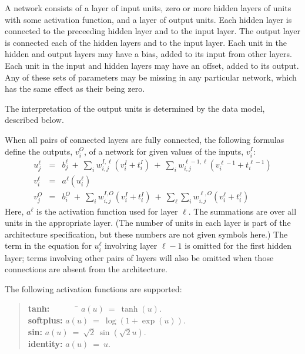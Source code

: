 \documentclass{report}[11pt]
\def\beq{\begin{eqnarray}}
\def\eeq{\end{eqnarray}}
\begin{document}
A network consists of a layer of input units, zero or more hidden
layers of units with some activation function, and a layer of output
units.  Each hidden layer is connected to the preceeding hidden layer
and to the input layer.  The output layer is connected each of the
hidden layers and to the input layer.  Each unit in the hidden and
output layers may have a bias, added to its input from other layers.
Each unit in the input and hidden layers may have an offset, added to
its output.  Any of these sets of parameters may be missing in any
particular network, which has the same effect as their being zero.

The interpretation of the output units is determined by the data
model, described below.

When all pairs of connected layers are fully connected, the following 
formulas define the outputs, $v^O_i$, of a network for given values 
of the inputs, $v^I_i$:\beq
  u^{\ell}_j & = & b^{\ell}_j \ +\ \sum_i w^{I,\ell}_{i,j} (v^I_i+t^I_i) 
                   \ +\ \sum_i w^{\ell-1,\ell}_{i,j} (v^{\ell-1}_i+t^{\ell-1}_i)
     \label{func1} \\[3pt]
  v^{\ell}_i & = & a^{\ell}(u^{\ell}_i) \label{func2} \\[5pt]
  v^O_j\!    & = & b^O_i \ +\ \sum_i w^{I,O}_{i,j} (v^I_i+t^I_i) 
             \ +\ \sum_{\ell} \sum_i w^{\ell,O}_{i,j} (v^{\ell}_i+t^{\ell}_i)
\label{func3}\eeq%
Here, $a^{\ell}$ is the activation function used for layer $\ell$.
The summations are over all units in the appropriate layer.  (The
number of units in each layer is part of the architecture
specification, but these numbers are not given symbols here.)  The
term in the equation for $u^{\ell}_i$ involving layer $\ell\!-\!1$ is
omitted for the first hidden layer; terms involving other pairs of
layers will also be omitted when those connections are absent from the
architecture.

The following activation functions are supported:\vspace{-22pt}
\begin{quotation}\noindent
\begin{tabbing}
{\bf tanh:}\ \ \ \ \ \ \ \= $a(u)\ =\ \tanh(u)$.\\[3pt]
{\bf softplus:}\> $a(u)\ =\ \log(1+\exp(u))$.\\[3pt]
{\bf sin:}\>  $a(u)\ =\ \sqrt{2}\,\sin(\sqrt{2}u)$.\\[4pt]
{\bf identity:}\> $a(u)\ =\ u$.\vspace{-5pt}
\end{tabbing}
\end{quotation}
\end{document}

